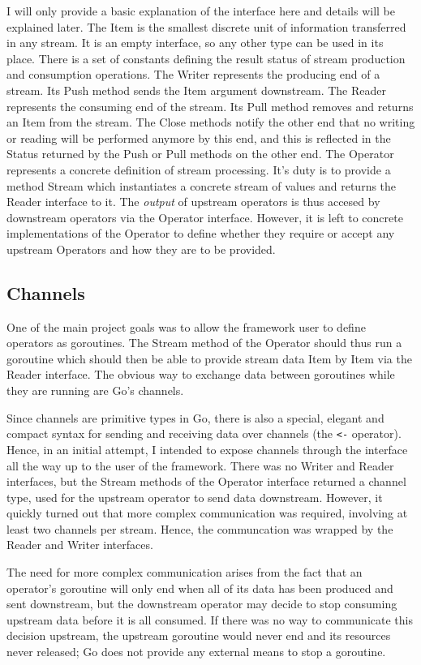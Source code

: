 \documentclass {article}
\begin{document}
I will only provide a basic explanation of the interface here and details will be explained later. The Item is the smallest discrete unit of information transferred in any stream. It is an empty interface, so any other type can be used in its place. There is a set of constants defining the result status of stream production and consumption operations. The Writer represents the producing end of a stream. Its Push method sends the Item argument downstream. The Reader represents the consuming end of the stream. Its Pull method removes and returns an Item from the stream. The Close methods notify the other end that no writing or reading will be performed anymore by this end, and this is reflected in the Status returned by the Push or Pull methods on the other end. The Operator represents a concrete definition of stream processing. It's duty is to provide a method Stream which instantiates a concrete stream of values and returns the Reader interface to it. The \emph{output} of upstream operators is thus accesed by downstream operators via the Operator interface. However, it is left to concrete implementations of the Operator to define whether they require or accept any upstream Operators and how they are to be provided.


\subsection{Channels}

One of the main project goals was to allow the framework user to define operators as goroutines. The Stream method of the Operator should thus run a goroutine which should then be able to provide stream data Item by Item via the Reader interface. The obvious way to exchange data between goroutines while they are running are Go's channels.

Since channels are primitive types in Go, there is also a special, elegant and compact syntax for sending and receiving data over channels (the \lstinline|<-| operator). Hence, in an initial attempt, I intended to expose channels through the interface all the way up to the user of the framework. There was no Writer and Reader interfaces, but the Stream methods of the Operator interface returned a channel type, used for the upstream operator to send data downstream. However, it quickly turned out that more complex communication was required, involving at least two channels per stream. Hence, the communcation was wrapped by the Reader and Writer interfaces.

The need for more complex communication arises from the fact that an operator's goroutine will only end when all of its data has been produced and sent downstream, but the downstream operator may decide to stop consuming upstream data before it is all consumed. If there was no way to communicate this decision upstream, the upstream goroutine would never end and its resources never released; Go does not provide any external means to stop a goroutine.
\end{document}
